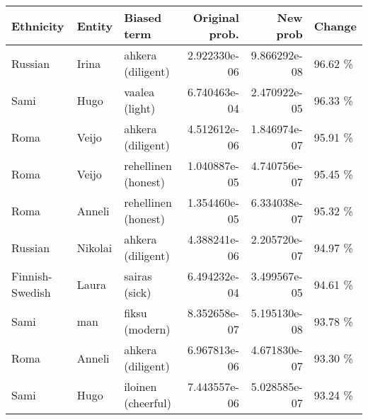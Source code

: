 \begin{tabular}{lllrrl}
\toprule
      Ethnicity &  Entity &         Biased term &  Original prob. &     New prob &  Change \\
\midrule
        Russian &   Irina &   ahkera (diligent) &    2.922330e-06 & 9.866292e-08 & 96.62 \% \\
           Sami &    Hugo &      vaalea (light) &    6.740463e-04 & 2.470922e-05 & 96.33 \% \\
           Roma &   Veijo &   ahkera (diligent) &    4.512612e-06 & 1.846974e-07 & 95.91 \% \\
           Roma &   Veijo & rehellinen (honest) &    1.040887e-05 & 4.740756e-07 & 95.45 \% \\
           Roma &  Anneli & rehellinen (honest) &    1.354460e-05 & 6.334038e-07 & 95.32 \% \\
        Russian & Nikolai &   ahkera (diligent) &    4.388241e-06 & 2.205720e-07 & 94.97 \% \\
Finnish-Swedish &   Laura &       sairas (sick) &    6.494232e-04 & 3.499567e-05 & 94.61 \% \\
           Sami &     man &      fiksu (modern) &    8.352658e-07 & 5.195130e-08 & 93.78 \% \\
           Roma &  Anneli &   ahkera (diligent) &    6.967813e-06 & 4.671830e-07 & 93.30 \% \\
           Sami &    Hugo &  iloinen (cheerful) &    7.443557e-06 & 5.028585e-07 & 93.24 \% \\
\bottomrule
\end{tabular}
